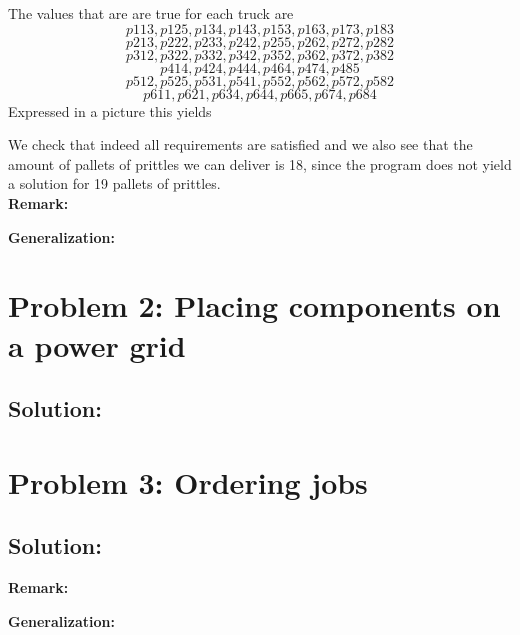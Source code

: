 \documentclass[a4paper]{article}
\begin{document}
The values that are are true for each truck are 
\[p113, p125, p134, p143, p153, p163, p173, p183 \]
\[p213, p222, p233, p242, p255, p262, p272, p282 \]
\[p312, p322, p332, p342, p352, p362, p372, p382 \]
\[p414, p424, p444, p464, p474, p485 \]
\[p512, p525, p531, p541, p552, p562, p572, p582 \]
\[p611, p621, p634, p644, p665, p674, p684 \]
Expressed in a picture this yields



We check that indeed all requirements are satisfied and we also see that the amount of pallets of prittles we can deliver is 18, since the program does not yield a solution for 19 pallets of prittles.\\

{\bf Remark:}


{\bf Generalization:} 


	\section*{Problem 2: Placing components on a power grid}
	

	\subsection*{Solution:}
	
	
	\section*{Problem 3: Ordering jobs}



	\subsection*{Solution:}



{\bf Remark:}


{\bf Generalization:} 
\end{document}
